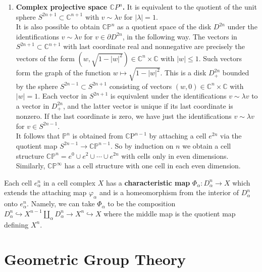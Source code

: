 \begin{example}
\begin{enumerate}
        \item \textbf{Complex projective space $\mathbb{C} P^n$.} It is equivalent to the quotient of the unit sphere $S^{2 n+1} \subset \mathbb{C}^{n+1}$ with $v \sim \lambda v$ for $|\lambda|=1$. \\
        It is also possible to obtain $\mathbb{C P}^n$ as a quotient space of the disk $D^{2 n}$ under the identifications $v \sim \lambda v$ for $v \in \partial D^{2 n}$, in the following way. The vectors in $S^{2 n+1} \subset \mathbb{C}^{n+1}$ with last coordinate real and nonnegative are precisely the vectors of the form $\left(w, \sqrt{1-|w|^2}\right) \in \mathbb{C}^n \times \mathbb{C}$ with $|w| \leq 1$. Such vectors form the graph of the function $w \mapsto \sqrt{1-|w|^2}$. This is a disk $D_{+}^{2 n}$ bounded by the sphere $S^{2 n-1} \subset S^{2 n+1}$ consisting of vectors $(w, 0) \in \mathbb{C}^n \times \mathbb{C}$ with $|w|=1$. Each vector in $S^{2 n+1}$ is equivalent under the identifications $v \sim \lambda v$ to a vector in $D_{+}^{2 n}$, and the latter vector is unique if its last coordinate is nonzero. If the last coordinate is zero, we have just the identifications $v \sim \lambda v$ for $v \in S^{2 n-1}$.\\
        It follows that $\mathbb{P}^n$ is obtained from $\mathbb{C} \mathrm{P}^{n-1}$ by attaching a cell $e^{2 n}$ via the quotient map $S^{2 n-1} \rightarrow \mathbb{C P}^{n-1}$. So by induction on $n$ we obtain a cell structure $\mathbb{C P}^n=e^0 \cup e^2 \cup \cdots \cup e^{2 n}$ with cells only in even dimensions. Similarly, $\mathbb{C P}^{\infty}$ has a cell structure with one cell in each even dimension.
    \end{enumerate}
\end{example}

Each cell $e_\alpha^n$ in a cell complex $X$ has a \textbf{characteristic map} $\Phi_\alpha: D_\alpha^n \rightarrow X$ which extends the attaching map $\varphi_\alpha$ and is a homeomorphism from the interior of $D_\alpha^n$ onto $e_\alpha^n$. Namely, we can take $\Phi_\alpha$ to be the composition $D_\alpha^n \hookrightarrow X^{n-1} \coprod_\alpha D_\alpha^n \rightarrow X^n \hookrightarrow X$ where the middle map is the quotient map defining $X^n$. 











\chapter{Geometric Group Theory}

